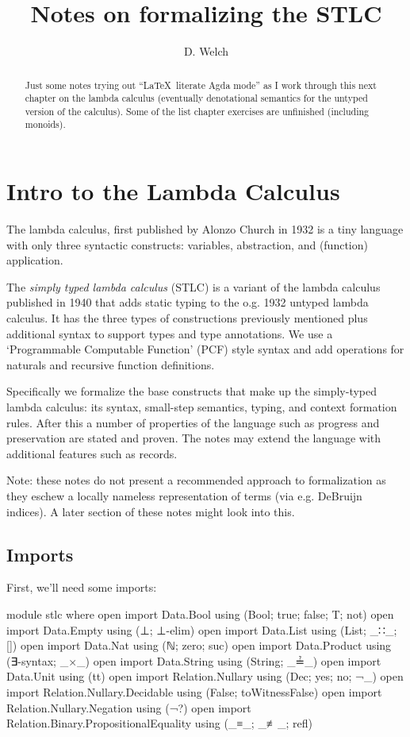 \documentclass[runningheads]{llncs}
\begin{document}
\title{Notes on formalizing the STLC}
\author{D. Welch}
\institute{}
\maketitle

\begin{abstract}
Just some notes trying out ``\LaTeX \ literate Agda mode'' as I work through 
this next chapter on the lambda calculus (eventually denotational semantics for
the untyped version of the calculus). Some of the list chapter exercises are
unfinished (including monoids).
\end{abstract}

\section{Intro to the Lambda Calculus} 

The lambda calculus, first published by Alonzo Church in 1932 is a tiny language 
with only three syntactic constructs: variables, abstraction, and (function) 
application. 

The \textit{simply typed lambda calculus} (STLC) is a variant of the lambda 
calculus published in 1940 that adds static typing to the o.g. 1932 untyped 
lambda calculus. It has the three types of constructions previously mentioned 
plus additional syntax to support types and type annotations. We use a 
`Programmable Computable Function' (PCF) style syntax and add operations for 
naturals and recursive function definitions.

Specifically we formalize the base constructs that make up the 
simply-typed lambda calculus: its syntax, small-step semantics, typing, and 
context formation rules. After this a number of properties of the language such 
as progress and preservation are stated and proven. The notes may extend the 
language with additional features such as records.

Note: these notes do not present a recommended approach to formalization as 
they eschew a locally nameless representation of terms (via e.g. DeBruijn 
indices). A later section of these notes might look into this. 

\subsection{Imports}

First, we'll need some imports:
\begin{code}
module stlc where 
open import Data.Bool using (Bool; true; false; T; not)
open import Data.Empty using (⊥; ⊥-elim)
open import Data.List using (List; _∷_; [])
open import Data.Nat using (ℕ; zero; suc)
open import Data.Product using (∃-syntax; _×_)
open import Data.String using (String; _≟_)
open import Data.Unit using (tt)
open import Relation.Nullary using (Dec; yes; no; ¬_)
open import Relation.Nullary.Decidable using (False; toWitnessFalse)
open import Relation.Nullary.Negation using (¬?)
open import Relation.Binary.PropositionalEquality using (_≡_; _≢_; refl)
\end{code}
\end{document}
